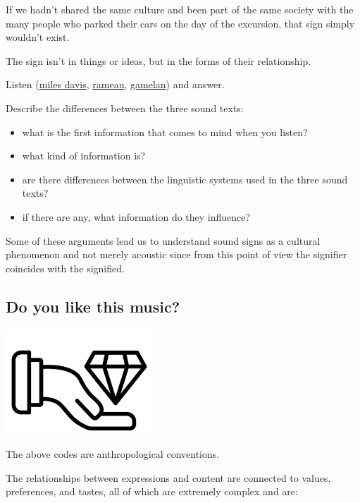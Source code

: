 If we hadn't shared the same culture and been part of the same society with the many people who parked their cars on the day of the excursion, that sign simply wouldn't exist.

The sign isn't in things or ideas, but in the forms of their relationship.

Listen (\href{https://github.com/musicaecodice/EMC/blob/main/1_premises/suoni/miles.mp3}{miles davis}, \href{https://github.com/musicaecodice/EMC/blob/main/1_premises/suoni/rameau.mp3}{rameau}, \href{https://github.com/musicaecodice/EMC/blob/main/1_premises/suoni/gamelan.mp3}{gamelan}) and answer.

Describe the differences between the three sound texts: 

\begin{itemize}
\tightlist
\item what is the first information that comes to mind when you listen? 
\item what kind of information is? 
\item are there differences between the linguistic systems used in the three sound texts? \item if there are any, what information do they influence?
\end{itemize}

Some of these arguments lead us to understand sound signs as a cultural phenomenon and not merely acoustic since from this point of view the signifier coincides with the signified.

\subsection{Do you like this music?}\label{do-you-like-this-music}

\begin{center}
\includegraphics[scale=0.4]{../img/valore.png}
\end{center}

The above codes are anthropological conventions.

The relationships between expressions and content are connected to values, preferences, and tastes, all of which are extremely complex and are:

